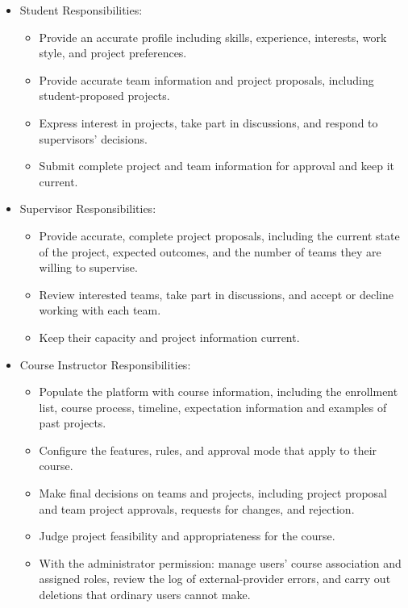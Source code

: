 \documentclass[12pt]{article}
\begin{document}
  \begin{itemize}
    \item Student Responsibilities:
    \begin{itemize}
      \item Provide an accurate profile including skills, experience, interests, work style, and project preferences.
      \item Provide accurate team information and project proposals, including student-proposed projects.
      \item Express interest in projects, take part in discussions, and respond to supervisors' decisions.
      \item Submit complete project and team information for approval and keep it current.
    \end{itemize}
    \item Supervisor Responsibilities:
    \begin{itemize}
      \item Provide accurate, complete project proposals, including the current state of the project,
      expected outcomes, and the number of teams they are willing to supervise.
      \item Review interested teams, take part in discussions, and accept or decline working with each team.
      \item Keep their capacity and project information current.
    \end{itemize}
    \item Course Instructor Responsibilities:
    \begin{itemize}
      \item Populate the platform with course information, including the enrollment list, course process,
      timeline, expectation information and examples of past projects.
      \item Configure the features, rules, and approval mode that apply to their course.
      \item Make final decisions on teams and projects, including project proposal and team project approvals,
      requests for changes, and rejection.
      \item Judge project feasibility and appropriateness for the course.
      \item With the administrator permission: manage users' course association and assigned roles, review the log of external-provider errors, and carry out deletions that ordinary users cannot make.
    \end{itemize}

\end{itemize}
\end{document}
